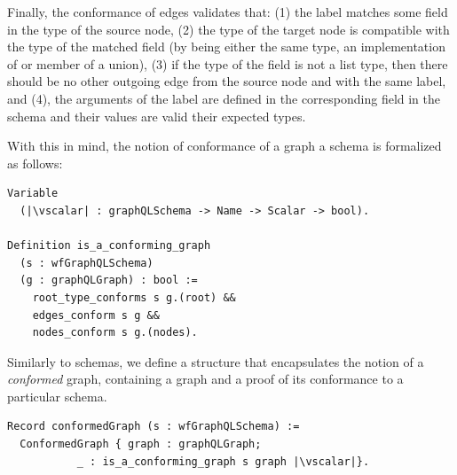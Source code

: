 Finally, the conformance of edges validates that: (1) the label
matches some field in the type of the source node, (2) the type of the
target node is compatible with the type of the matched field (by being
either the same type, an implementation of or member of a union), (3)
if the type of the field is not a list type, then there should be
no other outgoing edge from the source node and with the same label, and (4), the
arguments of the label are defined in the corresponding field in the schema and
their values are valid \wrt their expected types. 




With this in mind, the notion of conformance of a graph \wrt a schema is formalized as follows:
%
\begin{verbatim}
Variable 
  (|\vscalar| : graphQLSchema -> Name -> Scalar -> bool).
  
Definition is_a_conforming_graph 
  (s : wfGraphQLSchema) 
  (g : graphQLGraph) : bool :=
    root_type_conforms s g.(root) &&
    edges_conform s g &&
    nodes_conform s g.(nodes).
\end{verbatim}
%

Similarly to \gql schemas, we define a structure that encapsulates the notion of a \textit{conformed} graph, containing a graph and a proof of its conformance to a particular schema.
\begin{verbatim}
Record conformedGraph (s : wfGraphQLSchema) :=
  ConformedGraph { graph : graphQLGraph;
           _ : is_a_conforming_graph s graph |\vscalar|}.
\end{verbatim}

